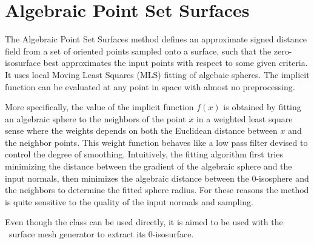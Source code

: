 
\section{Algebraic Point Set Surfaces}

The Algebraic Point Set Surfaces \cite{Guennebaud07} method defines an approximate signed distance field from a set of oriented points sampled onto a surface, such that the zero-isosurface best approximates the input points with respect to some given criteria.  It uses local Moving Least Squares (MLS) fitting of algebaic spheres. The implicit function can be evaluated at any point in space with almost no preprocessing.

More specifically, the value of the implicit function $f(x)$ is obtained by fitting an algebraic sphere to the neighbors of the point $x$ in a weighted least square sense where the weights depends on both the Euclidean distance between $x$ and the neighbor points. This weight function behaves like a low pass filter devised to control the degree of smoothing. Intuitively, the fitting algorithm first tries minimizing the distance between the gradient of the algebraic sphere and the input normals, then minimizes the algebraic distance between the 0-isosphere and the neighbors to determine the fitted sphere radius. For these reasons the method is quite sensitive to the quality of the input normals and sampling.

Even though the  class can be used directly, it is aimed to be used with the \cgal\ surface mesh generator to extract its $0$-isosurface.


